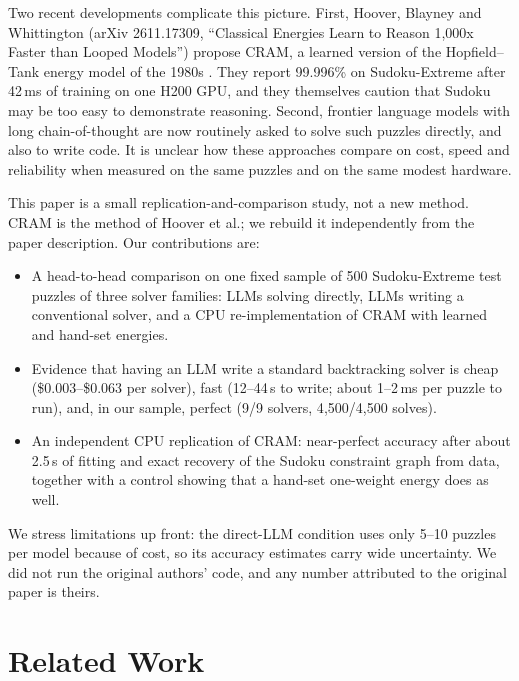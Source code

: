 \documentclass{article} %
\begin{document}
Two recent developments complicate this picture. First, Hoover, Blayney and Whittington (arXiv 2611.17309, ``Classical Energies Learn to Reason 1,000x Faster than Looped Models'') propose CRAM, a learned version of the Hopfield--Tank energy model of the 1980s \citep{hopfield1985tsp}. They report 99.996\% on Sudoku-Extreme after 42\,ms of training on one H200 GPU, and they themselves caution that Sudoku may be too easy to demonstrate reasoning. Second, frontier language models with long chain-of-thought are now routinely asked to solve such puzzles directly, and also to write code. It is unclear how these approaches compare on cost, speed and reliability when measured on the same puzzles and on the same modest hardware.

This paper is a small replication-and-comparison study, not a new method. CRAM is the method of Hoover et al.; we rebuild it independently from the paper description. Our contributions are:
\begin{itemize}
\item A head-to-head comparison on one fixed sample of 500 Sudoku-Extreme test puzzles of three solver families: LLMs solving directly, LLMs writing a conventional solver, and a CPU re-implementation of CRAM with learned and hand-set energies.
\item Evidence that having an LLM write a standard backtracking solver is cheap (\$0.003--\$0.063 per solver), fast (12--44\,s to write; about 1--2\,ms per puzzle to run), and, in our sample, perfect (9/9 solvers, 4{,}500/4{,}500 solves).
\item An independent CPU replication of CRAM: near-perfect accuracy after about 2.5\,s of fitting and exact recovery of the Sudoku constraint graph from data, together with a control showing that a hand-set one-weight energy does as well.
\end{itemize}
We stress limitations up front: the direct-LLM condition uses only 5--10 puzzles per model because of cost, so its accuracy estimates carry wide uncertainty. We did not run the original authors' code, and any number attributed to the original paper is theirs.

\section{Related Work}
\label{sec:related_work}
\end{document}
